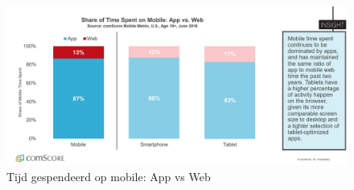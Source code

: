 \documentclass[fleqn,a4paper,12pt]{book}
\begin{document}

\inserttitlepage

\usechapterimagefalse



\pagestyle{empty} %
\tableofcontents %
\cleardoublepage %
\pagestyle{fancy} %







%
%




\printbibliography
{}


\listoffigures

\begin{figure}
\includegraphics[scale=0.75]{img/usage.png}
 \caption{Tijd gespendeerd op mobile: App vs Web}
 \label{fig:usage}
\end{figure}
\end{document}
